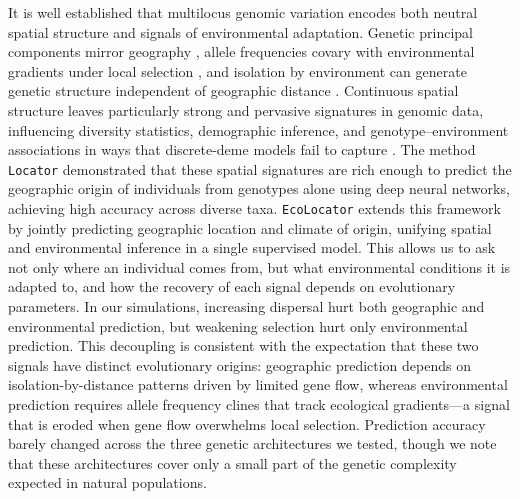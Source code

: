 \documentclass[]{article}
\newcommand{\ecolocator}{\texttt{EcoLocator}\xspace}
\begin{document}
It is well established that multilocus genomic variation
encodes both neutral spatial structure
and signals of environmental adaptation.
Genetic principal components mirror geography
\citep{novembre_genes_2008},
allele frequencies covary with environmental gradients
under local selection
\citep{coop_using_2010, savolainen_ecological_2013},
and isolation by environment can generate genetic structure
independent of geographic distance
\citep{wang_isolation_2014}.
Continuous spatial structure leaves particularly strong
and pervasive signatures in genomic data,
influencing diversity statistics, demographic inference,
and genotype--environment associations
in ways that discrete-deme models fail to capture
\citep{battey_space_2020, chevy_popgen_ecology_2025}.
The method \texttt{Locator} \citep{battey_predicting_2020} demonstrated
that these spatial signatures are rich enough
to predict the geographic origin of individuals
from genotypes alone using deep neural networks,
achieving high accuracy across diverse taxa.
\ecolocator extends this framework
by jointly predicting geographic location
and climate of origin,
unifying spatial and environmental inference
in a single supervised model.
This allows us to ask not only where an individual comes from,
but what environmental conditions it is adapted to,
and how the recovery of each signal
depends on evolutionary parameters.
In our simulations, increasing dispersal hurt both geographic and environmental
prediction, but weakening selection hurt only environmental prediction.
This decoupling is consistent with the expectation
that these two signals have distinct evolutionary origins:
geographic prediction depends on isolation-by-distance patterns
driven by limited gene flow,
whereas environmental prediction requires
allele frequency clines that track ecological gradients---a
signal that is eroded
when gene flow overwhelms local selection.
Prediction accuracy barely changed across the three genetic architectures
we tested, though we note that these architectures cover only a small part
of the genetic complexity expected in natural populations.
\end{document}
